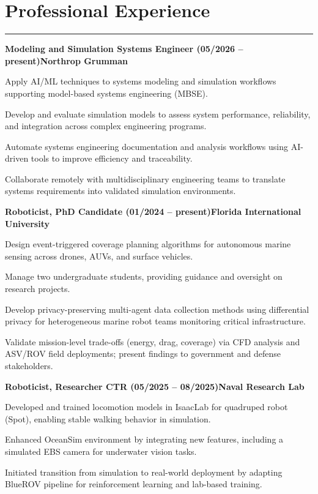 \documentclass[10pt,letterpaper]{article}
\newcommand{\sectionrule}{\vspace{-2pt}\hrule\vspace{4pt}}
\newcommand{\jobheader}[3]{%
  \vspace{2pt}\noindent\textbf{#1 (#2)}\hfill\textbf{#3}\par\vspace{1pt}%
}
\begin{document}
\section{Professional Experience}
\sectionrule
\fontsize{9}{11}\selectfont

\jobheader{Modeling and Simulation Systems Engineer}{05/2026 -- present}{Northrop Grumman}
\begin{tightlist}
\item Apply AI/ML techniques to systems modeling and simulation workflows supporting model-based systems engineering (MBSE).
\item Develop and evaluate simulation models to assess system performance, reliability, and integration across complex engineering programs.
\item Automate systems engineering documentation and analysis workflows using AI-driven tools to improve efficiency and traceability.
\item Collaborate remotely with multidisciplinary engineering teams to translate systems requirements into validated simulation environments.
\end{tightlist}

\jobheader{Roboticist, PhD Candidate}{01/2024 -- present}{Florida International University}
\begin{tightlist}
\item Design event-triggered coverage planning algorithms for autonomous marine sensing across drones, AUVs, and surface vehicles.
\item Manage two undergraduate students, providing guidance and oversight on research projects.
\item Develop privacy-preserving multi-agent data collection methods using differential privacy for heterogeneous marine robot teams monitoring critical infrastructure.
\item Validate mission-level trade-offs (energy, drag, coverage) via CFD analysis and ASV/ROV field deployments; present findings to government and defense stakeholders.
\end{tightlist}

\jobheader{Roboticist, Researcher CTR}{05/2025 -- 08/2025}{Naval Research Lab}
\begin{tightlist}
\item Developed and trained locomotion models in IsaacLab for quadruped robot (Spot), enabling stable walking behavior in simulation.
\item Enhanced OceanSim environment by integrating new features, including a simulated EBS camera for underwater vision tasks.
\item Initiated transition from simulation to real-world deployment by adapting BlueROV pipeline for reinforcement learning and lab-based training.
\end{tightlist}
\end{document}
